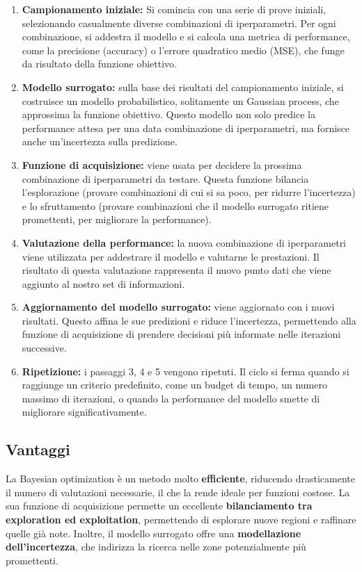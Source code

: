 \documentclass[a4paper,12pt]{report}
\begin{document}
	\begin{enumerate}
		\item \textbf{Campionamento iniziale:} Si comincia con una serie di prove iniziali, selezionando casualmente diverse combinazioni di iperparametri. Per ogni combinazione, si addestra il modello e si calcola una metrica di performance, come la precisione (accuracy) o l'errore quadratico medio (MSE), che funge da risultato della funzione obiettivo.
		\item \textbf{Modello surrogato:} sulla base dei risultati del campionamento iniziale, si costruisce un modello probabilistico, solitamente un Gaussian process, che approssima la funzione obiettivo. Questo modello non solo predice la performance attesa per una data combinazione di iperparametri, ma fornisce anche un'incertezza sulla predizione.
		\item \textbf{Funzione di acquisizione:} viene usata per decidere la prossima combinazione di iperparametri da testare. Questa funzione bilancia l'esplorazione (provare combinazioni di cui si sa poco, per ridurre l'incertezza) e lo sfruttamento (provare combinazioni che il modello surrogato ritiene promettenti, per migliorare la performance).
		\item \textbf{Valutazione della performance:} la nuova combinazione di iperparametri viene utilizzata per addestrare il modello e valutarne le prestazioni. Il risultato di questa valutazione rappresenta il nuovo punto dati che viene aggiunto al nostro set di informazioni.
		\item \textbf{Aggiornamento del modello surrogato:} viene aggiornato con i nuovi risultati. Questo affina le sue predizioni e riduce l'incertezza, permettendo alla funzione di acquisizione di prendere decisioni più informate nelle iterazioni successive.
		\item \textbf{Ripetizione:} i passaggi 3, 4 e 5 vengono ripetuti. Il ciclo si ferma quando si raggiunge un criterio predefinito, come un budget di tempo, un numero massimo di iterazioni, o quando la performance del modello smette di migliorare significativamente.
	\end{enumerate}
	
	\subsection{Vantaggi}
	La Bayesian optimization è un metodo molto \textbf{efficiente}, riducendo drasticamente il numero di valutazioni necessarie, il che la rende ideale per funzioni costose. La sua funzione di acquisizione permette un eccellente \textbf{bilanciamento tra exploration ed exploitation}, permettendo di esplorare nuove regioni e raffinare quelle già note. Inoltre, il modello surrogato offre una \textbf{modellazione dell'incertezza}, che indirizza la ricerca nelle zone potenzialmente più promettenti.
	
\end{document}
